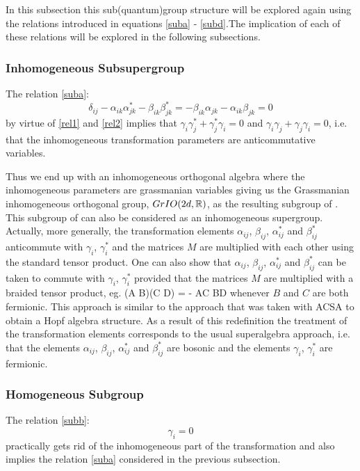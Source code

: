 In this subsection this sub(quantum)group structure will be explored again using
the relations introduced in equations \eqref{suba} - \eqref{subd}.The
implication of each of these relations will be explored in
the following subsections.

\subsubsection{Inhomogeneous Subsupergroup}
The relation \eqref{suba}:
\[
\delta_{ij} - \alpha_{ik}\alpha^*_{jk} - \beta_{ik} \beta^*_{jk}
= - \beta_{ik} \alpha_{jk} - \alpha_{ik} \beta_{jk} = 0
\]
by virtue of \eqref{rel1} and \eqref{rel2} implies that $\gamma_i
\gamma^*_j + \gamma^*_j \gamma_i = 0$ and $\gamma_i \gamma_j +
\gamma_j \gamma_i = 0$, i.e. that the inhomogeneous transformation
parameters are anticommutative variables.

Thus we end up with an
inhomogeneous orthogonal algebra where the inhomogeneous
parameters are grassmanian variables giving us the Grassmanian
inhomogeneous orthogonal group, $GrIO(2d, \mathbb{R})$, as the resulting
subgroup of \FIO. This subgroup of \FIO can also be considered
as an inhomogeneous supergroup. Actually, more generally, the
transformation elements $\alpha_{ij}$, $\beta_{ij}$, $\alpha^*_{ij}$
and $\beta^*_{ij}$ anticommute with
$\gamma_i$, $\gamma^*_i$ and the \FIO matrices $M$ are multiplied
with each other using the standard tensor product. One can also show
that $\alpha_{ij}$, $\beta_{ij}$, $\alpha^*_{ij}$ and $\beta^*_{ij}$ can
be taken to commute with $\gamma_i$, $\gamma^*_i$ provided that
the matrices $M$ are multiplied with a braided \cite{majid} tensor product,
eg. \beq (A \otimes B)(C \otimes D) = - AC \otimes BD \eeq whenever $B$ and
$C$ are both fermionic. This approach is similar to the approach that was
taken with ACSA to obtain a Hopf algebra structure. As a result of this
redefinition the treatment of the transformation elements corresponds to
the usual superalgebra approach, i.e. that the elements $\alpha_{ij}$,
$\beta_{ij}$, $\alpha^*_{ij}$ and $\beta^*_{ij}$ are bosonic and the elements
$\gamma_i$, $\gamma^*_i$ are fermionic.

\subsubsection{Homogeneous Subgroup}
The relation \eqref{subb}:
\[
\gamma_i = 0
\]
practically gets rid of the inhomogeneous part of the
transformation and also implies the relation \eqref{suba} considered
in the previous subsection.

